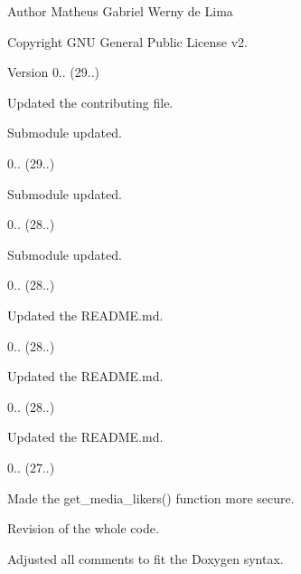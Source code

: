 \begin{DoxyAuthor}{Author}
Matheus Gabriel Werny de Lima 
\end{DoxyAuthor}
\begin{DoxyCopyright}{Copyright}
G\+NU General Public License v2. 
\end{DoxyCopyright}
\begin{DoxyVersion}{Version}
0.. (29..)
\begin{DoxyItemize}
\item Updated the contributing file.
\item Submodule updated. 
\end{DoxyItemize}

0.. (29..)
\begin{DoxyItemize}
\item Submodule updated. 
\end{DoxyItemize}

0.. (28..)
\begin{DoxyItemize}
\item Submodule updated. 
\end{DoxyItemize}

0.. (28..)
\begin{DoxyItemize}
\item Updated the R\+E\+A\+D\+M\+E.\+md. 
\end{DoxyItemize}

0.. (28..)
\begin{DoxyItemize}
\item Updated the R\+E\+A\+D\+M\+E.\+md. 
\end{DoxyItemize}

0.. (28..)
\begin{DoxyItemize}
\item Updated the R\+E\+A\+D\+M\+E.\+md. 
\end{DoxyItemize}

0.. (27..)
\begin{DoxyItemize}
\item Made the get\+\_\+media\+\_\+likers() function more secure.
\item Revision of the whole code.
\item Adjusted all comments to fit the Doxygen syntax. 
\end{DoxyItemize}
\end{DoxyVersion}
